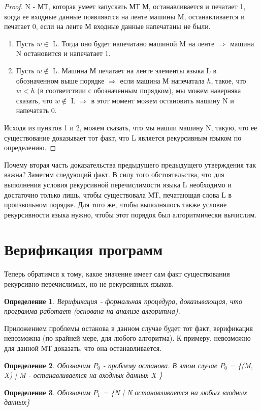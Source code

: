 \documentclass[a4paper]{article}
\newtheorem{definition}{Определение}
\begin{document}
{\begin{proof}
 N - МТ, которая умеет запускать МТ М, останавливается и печатает 1, когда ее входные данные появляются на ленте машины M, останавливается и печатает 0, если на ленте М входные данные напечатаны не были.
\begin{enumerate}
\item Пусть $w \in$ L. Тогда оно будет напечатано машиной M на ленте $\Rightarrow$ машина N остановится и напечатает 1.
\item Пусть $w \notin$ L. Машина М печатает на ленте элементы языка L в обозначенном выше порядке $\Rightarrow$ если машина М напечатала $h$, такое, что $w < h$ (в соответствии с обозначенным порядком), мы можем наверняка сказать, что $w \notin$ L $\Rightarrow$ в этот момент можем остановить машину N и напечатать 0.
\end{enumerate}
Исходя из пунктов 1 и 2, можем сказать, что мы нашли машину N, такую, что ее существование доказывает тот факт, что L является рекурсивным языком по определению.
\end{proof}
Почему вторая часть доказательства предыдущего предыдущего утверждения так важна? 
\newline Заметим следующий факт. В силу того обстоятельства, что для выполнения условия рекурсивной перечислимости языка L необходимо и достаточно только лишь, чтобы существовала МТ, печатающая слова L в произвольном порядке. Для того же, чтобы выполнялось также условие рекурсивности языка нужно, чтобы этот порядок был алгоритмически вычислим. 

\section{Верификация программ}
Теперь обратимся к тому, какое значение имеет сам факт существования рекурсивно-перечислимых, но не рекурсивных языков. 
\begin{definition}
Верификация - формальная процедура, доказывающая, что программа работает (основана на анализе алгоритма).
\end{definition}
Приложением проблемы останова в данном случае будет тот факт, верификация невозможна (по крайней мере, для любого алгоритма). К примеру, невозможно для данной МТ доказать, что она останавливается.
\begin{definition}
Обозначим $P_0$ - проблему останова. В этом случае $P_0$ = \{(M, X) | M - останавливается на входных данных X \}
\end{definition}
\begin{definition}
Обозначим $P_1$ = \{N | N останавливается на любых входных данных\}
\end{definition}

}
\end{document}
